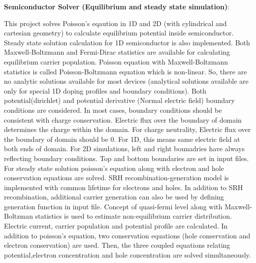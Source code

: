 \textbf{Semiconductor Solver (Equilibrium and steady state simulation)}:

This project solves Poisson's eqaution in 1D and 2D (with cylindrical and cartesian geometry) to calculate equilibrium potential inside semiconductor. Steady state solution calculation for 1D semiconductor is also implemented.                                                                                                                                      Both Maxwell-Boltzmann and Fermi-Dirac statistics are available for calculating equilibrium carrier population. Poisson equation with Maxwell-Boltzmann statistics is called Poisson-Boltzmann equation which is non-linear. So, there are no analytic solutions available for most devices (analytical solutions available are only for special 1D doping profiles and boundary conditions).                                                                                                                                                                                                                           Both potential(dirichlet) and potential derivative (Normal electric field) boundary conditions are considered. In most cases, boundary conditions should be consistent with charge conservation. Electric flux over the boundary of domain determines the charge within the domain. For charge neutrality, Electric flux over the boundary of domain should be 0. For 1D, this means same electric field at both ends of domain.  For 2D simulations, left and right bounadries have always reflecting boundary conditions. Top and bottom boundaries are set in input files.                                                                                                                                                                   For steady state solution poisson's equation along with electron and hole conservation equations are solved. SRH recombination-generation model is implemented with common lifetime for electrons and holes. In addition to SRH recombination, additional carrier generation can also be used by defining generation function in input file. Concept of quasi-fermi level along with Maxwell-Boltzman statistics is used to estimate non-equilibrium carrier distribution. Electric current, carrier population and potential profile are calculated. In addition to poisson's equation, two conservation equations (hole conservation and electron conservation) are used. Then, the three coupled equations relating potential,electron concentration and hole concentration are solved simultaneously.

